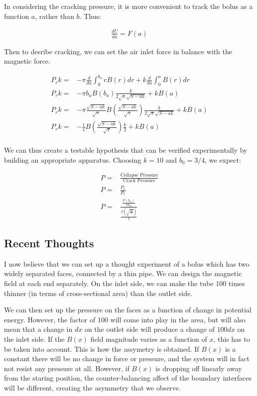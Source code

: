 \documentclass{asme2ej}
\begin{document}
In considering the cracking pressure, it is more convenient to track the bolus as a function $a$,
rather than $b$. Thus:

\begin{align}
  \frac{d U}{da} =  F(a)
\end{align}

Then to desribe cracking, we can set the air inlet force in balance with the magnetic force.

\begin{align}
  P_r k = & - \pi \frac{d }{da} \int_0^{b_a} r B(r) dr  + k \frac{d }{da} \int_0^a B(r) dr \\
  P_r k = & - \pi b_a B(b_a) \frac{k}{2 \sqrt{\pi} \sqrt{S - a k}} + k B(a) \\
  P_r k = & - \pi \frac{\sqrt{S - ak}}{\sqrt{\pi}} B(\frac{\sqrt{S - ak}}{\sqrt{\pi}}) \frac{k}{2 \sqrt{\pi} \sqrt{S - a k}} + k B(a) \\
  P_r k = & -  \frac{1}{1} B(\frac{\sqrt{S - ak}}{\sqrt{\pi}}) \frac{k}{2} + k B(a) \\
\end{align}

We can thus create a testable hypothesis that can be verified experimentally by building an appropriate
apparatus. Choosing $k = 10$ and $b_0 = 3/4$, we expect:

\begin{align}
  P = & \frac{\text{Collapse Pressure}}{\text{Crack Pressure}} \\
  P = & \frac{P_c}{P_r} \\
  P = & \frac{\frac{F(b_m)}{\pi b_m}}{\frac{F(\sqrt{\frac{2S}{\pi}})}{k}}
\end{align}

\subsection{Recent Thoughts}

I now believe that we can set up a thought experiment of a bolus
which has two widely separated faces, connected by a thin pipe.
We can design the magnetic field at each end separately.
On the inlet side, we can make the tube 100 times thinner
(in terms of cross-sectional area) than the outlet side.

We can then set up the pressure on the faces as a function
of change in potential energy. However, the factor of 100 will
come into play in the area, but will also mean that a change
in $dx$ on the outlet side will produce a change of $100dx$ on
the inlet side. If the $B(x)$ field magnitude varies as a function
of $x$, this has to be taken into account. This is how the
assymetry is obtained. If $B(x)$ is a constant there will
be no change in force or pressure, and the system will in fact
not resist any pressure at all. However, if $B(x)$ is dropping
off linearly away from the staring position, the counter-balancing
affect of the boundary interfaces will be different, creating the
asymmetry that we observe.
\end{document}
